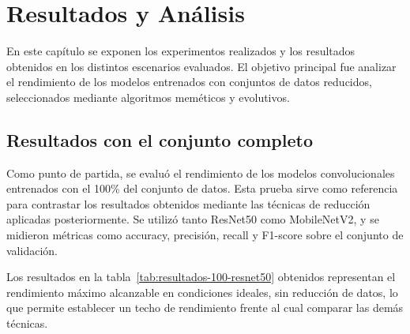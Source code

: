 
\chapter{Resultados y Análisis}\label{ch:resultados-y-analisis}
En este capítulo se exponen los experimentos realizados y los resultados obtenidos en los distintos escenarios evaluados.
El objetivo principal fue analizar el rendimiento de los modelos entrenados con conjuntos de datos reducidos,
seleccionados mediante algoritmos meméticos y evolutivos.


\section{Resultados con el conjunto completo}\label{sec:resultados-conjunto-completo}
Como punto de partida, se evaluó el rendimiento de los modelos convolucionales entrenados con el 100\% del conjunto de datos.
Esta prueba sirve como referencia para contrastar los resultados obtenidos mediante las técnicas de reducción aplicadas posteriormente.
Se utilizó tanto ResNet50 como MobileNetV2, y se midieron métricas como accuracy, precisión, recall y F1-score sobre el conjunto de validación.

\begin{table}[htp]
    \centering
    \caption{Resultados de ResNet50 entrenado con el 100\% del conjunto de datos.}
    \label{tab:resultados-100-resnet50}
\end{table}

Los resultados en la tabla~\ref{tab:resultados-100-resnet50} obtenidos representan el rendimiento máximo alcanzable en condiciones ideales,
sin reducción de datos, lo que permite establecer un techo de rendimiento frente al cual comparar las demás técnicas.


